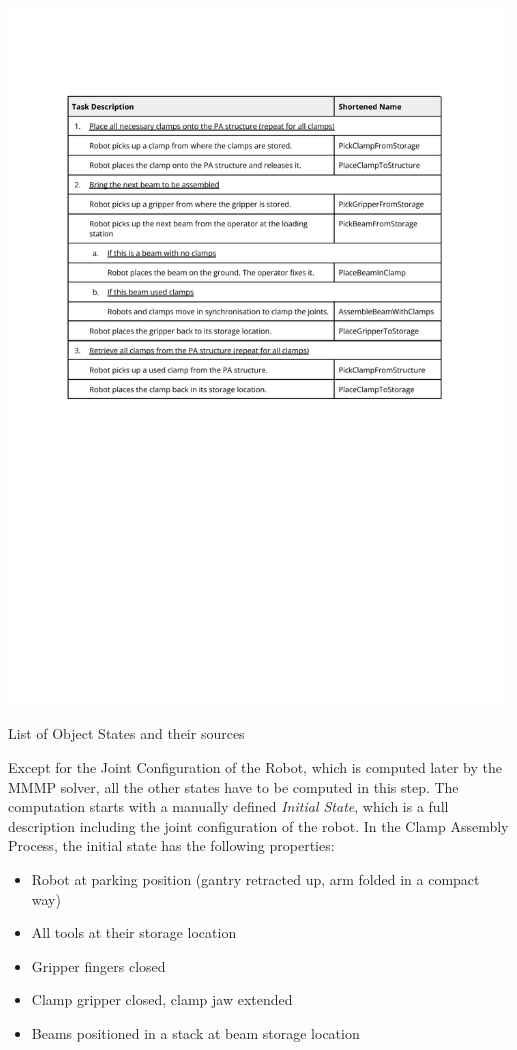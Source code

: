 \begin{table}[!h]
    \includegraphics[page=5, trim=25.4mm 190mm 25.4mm 33mm, clip, width=0.98\textwidth]{tables/Tables in Chapter 6.pdf}
    \caption{List of Object States and their sources}
    \label{table:object-states-list-and-sources}
\end{table}

Except for the Joint Configuration of the Robot, which is computed later by the MMMP solver, all the other states have to be computed in this step. The computation starts with a manually defined \textit{Initial State}, which is a full description including the joint configuration of the robot. In the Clamp Assembly Process, the initial state has the following properties:

\begin{itemize}
	\item Robot at parking position (gantry retracted up, arm folded in a compact way)
	\item All tools at their storage location
	\item Gripper fingers closed
	\item Clamp gripper closed, clamp jaw extended
	\item Beams positioned in a stack at beam storage location
\end{itemize}

